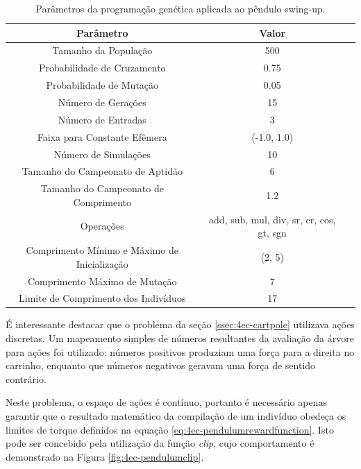 \begin{table}[H]
	\centering
	\begin{tabular}{SSS} \toprule
		{Parâmetro} & {Valor} \\ \midrule
		{Tamanho da População} & {500} \\
		{Probabilidade de Cruzamento} & {0.75} \\
		{Probabilidade de Mutação} & {0.05} \\
		{Número de Gerações} & {15} \\
		{Número de Entradas} & {3} \\
		{Faixa para Constante Efêmera} & {(-1.0, 1.0)} \\
		{Número de Simulações} & {10} \\
		{Tamanho do Campeonato de Aptidão} & {6} \\
		{Tamanho do Campeonato de Comprimento} & {1.2} \\
		{Operações} & {add, sub, mul, div, sr, cr, cos, gt, sgn} \\
		{Comprimento Mínimo e Máximo de Inicialização} & {(2, 5)} \\
		{Comprimento Máximo de Mutação} & {7} \\
		{Limite de Comprimento dos Indivíduos} & {17} \\
		\bottomrule
	\end{tabular}
	\caption{Parâmetros da programação genética aplicada ao pêndulo swing-up.}\label{tab:4ec-pendulumparam}
\end{table}

É interessante destacar que o problema da seção \ref{ssec:4ec-cartpole} utilizava ações discretas. Um mapeamento simples de números resultantes da avaliação da árvore para ações foi utilizado: números positivos produziam uma força para a direita no carrinho, enquanto que números negativos geravam uma força de sentido contrário. 

Neste problema, o espaço de ações é contínuo, portanto é necessário apenas garantir que o resultado matemático da compilação de um indivíduo obedeça os limites de torque definidos na equação \ref{eq:4ec-pendulumrewardfunction}. Isto pode ser concebido pela utilização da função \textit{clip}, cujo comportamento é demonstrado na Figura \ref{fig:4ec-pendulumclip}.

